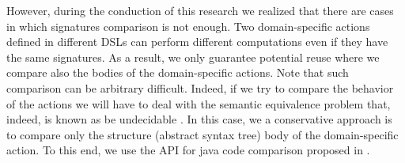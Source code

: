 However, during the conduction of this research we realized that there are cases in which signatures comparison is not enough. Two domain-specific actions defined in different DSLs can perform different computations even if they have the same signatures. As a result, we only guarantee potential reuse where we compare also the bodies of the domain-specific actions. Note that such comparison can be arbitrary difficult. Indeed, if we try to compare  the behavior of the actions we will have to deal with the semantic equivalence problem that, indeed, is known as be undecidable \cite{Lucanu:2013}. In this case, we a conservative approach is to compare only the structure (abstract syntax tree) body of the domain-specific action. To this end, we use the API for java code comparison proposed in \cite{Biegel:2010}.




